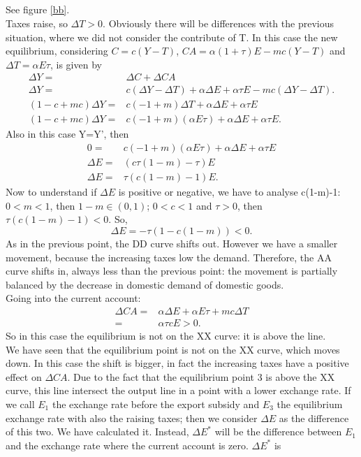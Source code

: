\documentclass[	11pt, ]{fphw}
\begin{document}
\subsection{}
See figure \vref{bb}. \\
Taxes raise, so $\Delta T >0$. Obviously there will be differences with the previous situation, where we did not consider the contribute of T. In this case the new equilibrium, considering $C=c(Y-T)$, $CA=\alpha(1+\tau)E-mc(Y-T)$ and $\Delta T=\alpha E \tau$, is given by
\begin{align}
    \Delta Y=&\Delta C+\Delta CA   \\
    \Delta Y=&c (\Delta Y-\Delta T)+\alpha\Delta E + \alpha \tau E -mc(\Delta Y-\Delta T). \\
     (1-c+mc)\Delta Y=&c(-1+m)\Delta T +\alpha\Delta E + \alpha \tau E  \\
     (1-c+mc)\Delta Y=&c(-1+m)(\alpha E \tau)+\alpha\Delta E + \alpha \tau E .
\end{align}
Also in this case Y=Y', then
\begin{align}
    0=&c(-1+m)(\alpha E \tau)+\alpha\Delta E + \alpha \tau E  \\
    \Delta E= & (c\tau(1-m)-\tau) E
    \\
    \Delta E= &\tau (c(1-m)-1) E .
\end{align}
Now to understand if $\Delta E$ is positive or negative, we have to analyse c(1-m)-1: $0<m<1$, then $1-m\in (0,1)$; $0<c<1$ and $\tau>0$, then $\tau (c(1-m)-1)<0$. So,
\[\Delta E= - \tau (1-c(1-m)) <0. \]
As in the previous point, the DD curve shifts out. However we have a smaller movement, because the increasing taxes low the demand. Therefore, the AA curve shifts in, always less than the previous point: the movement is partially balanced by the decrease in domestic demand of domestic goods. \\
Going into the current account: 
\begin{align} \label{ca}
    \Delta CA= &\alpha \Delta E + \alpha E \tau +mc \Delta T \\
    =& \alpha \tau c E >0.
\end{align} 
So in this case the equilibrium is not on the XX curve: it is above the line.\\
We have seen that the equilibrium point is not on the XX curve, which moves down. In this case the shift is bigger, in fact the increasing taxes have a positive effect on $\Delta CA$. Due to the fact that the equilibrium point 3 is above the XX curve, this line intersect the output line in a point with a lower exchange rate. If we call $E_{1}$ the exchange rate before the export subsidy and $E_{3}$ the equilibrium exchange rate with also the raising taxes; then we consider $\Delta E$ as the difference of this two. We have calculated it. Instead, $\Delta E^{*}$ will be the difference between $E_{1}$ and the exchange rate where the current account is zero. $\Delta E^{*}$ is 
\end{document}
